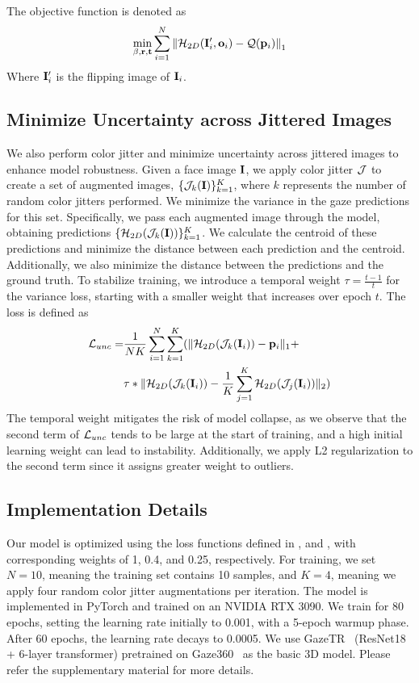 The objective function is denoted as 
\begin{equation}
    \min_{\beta, \mathbf{r}, \mathbf{t}} \sum_{i=1}^{N}\left\|\mathcal{H}_{2D}(\mathbf{I}_i', \mathbf{o}_i) - \mathcal{Q}(\mathbf{p}_i)\right\|_1
    \label{equ:loss2}
\end{equation}
Where $\mathbf{I}_i'$ is the flipping image of $\mathbf{I}_i$. 


\subsection{Minimize Uncertainty across Jittered Images}
We also perform color jitter and minimize uncertainty across jittered images to enhance model robustness. 
Given a face image $\mathbf{I}$, we apply color jitter $\mathcal{J}$ to create a set of augmented images, $\{\mathcal{J}_k(\mathbf{I})\}_{k=1}^K$, where $k$ represents the number of random color jitters performed. We minimize the variance in the gaze predictions for this set. Specifically, we pass each augmented image through the model, obtaining predictions $\{\mathcal{H}_{2D}(\mathcal{J}_k(\mathbf{I}))\}_{k=1}^K$.
We calculate the centroid of these predictions and minimize the distance between each prediction and the centroid. Additionally, we also minimize the distance between the predictions and the ground truth.
To stabilize training, we introduce a temporal weight $\tau=\frac{t-1}{t}$ for the variance loss, starting with a smaller weight that increases over epoch $t$. The loss is defined as 
\begin{equation}
\begin{aligned}
    \mathcal{L}_{unc} = & \frac{1}{NK} \sum_{i=1}^N\sum_{k=1}^K (\|\mathcal{H}_{2D}(\mathcal{J}_k(\mathbf{I}_i)) - \mathbf{p}_i\|_1 + \\
    &\tau*\|\mathcal{H}_{2D}(\mathcal{J}_k(\mathbf{I}_i)) - \frac{1}{K}\sum_{j=1}^K\mathcal{H}_{2D}(\mathcal{J}_j(\mathbf{I}_i))\|_2)
\end{aligned}
\label{equ:loss3}
\end{equation}
The temporal weight mitigates the risk of model collapse, as we observe that the second term of $\mathcal{L}_{unc}$ tends to be large at the start of training, and a high initial learning weight can lead to instability. Additionally, we apply L2 regularization  to the second term since it assigns greater weight to outliers.

\subsection{Implementation Details}
Our model is optimized using the loss functions defined in ,  and , with corresponding weights of 1, 0.4, and 0.25, respectively.
For training, we set $N=10$, meaning the training set contains 10 samples, and $K=4$, meaning we apply four random color jitter augmentations per iteration. The model is implemented in PyTorch and trained on an NVIDIA RTX 3090. We train for 80 epochs, setting the learning rate initially to 0.001, with a 5-epoch warmup phase. After 60 epochs, the learning rate decays to 0.0005. We use GazeTR~\cite{cheng2022icpr} (ResNet18 + 6-layer transformer) pretrained on Gaze360~\cite{Kellnhofer_2019_ICCV} as the basic 3D model. 
Please refer the supplementary material for more details.






